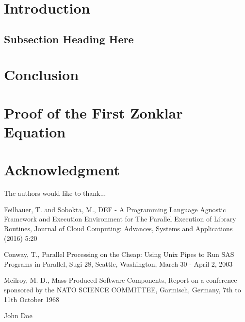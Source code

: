 \documentclass[conference]{IEEEtran}
\begin{document}
\section{Introduction}
\blindtext
\cite{def:feilhauer}


\subsection{Subsection Heading Here}
\blindtext


\section{Conclusion}
\blindtext


\appendices
\section{Proof of the First Zonklar Equation}
\blindtext

\section*{Acknowledgment}
The authors would like to thank...

\ifCLASSOPTIONcaptionsoff
  \newpage
\fi

\begin{thebibliography}{1}

Feilhauer, T. and Sobokta, M., DEF - A Programming Language Agnostic Framework and Execution Environment for The Parallel Execution of Library Routines, Journal of Cloud Computing: Advances, Systems and Applications (2016) 5:20

Conway, T., Parallel Processing on the Cheap: Using Unix Pipes to Run SAS Programs in Parallel, Sugi 28, Seattle, Washington, March 30 - April 2, 2003 

Mcilroy, M. D., Mass Produced Software Components, Report on a conference sponsored by the NATO SCIENCE COMMITTEE, Garmisch, Germany, 7th to 11th October 1968



\end{thebibliography}

\begin{IEEEbiography}{John Doe}
\blindtext
\end{IEEEbiography}



\end{document}
